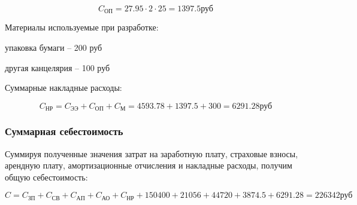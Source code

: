 $$ C_\text{ОП} = 27.95 \cdot 2 \cdot 25 = 1397.5 \text{руб} $$

\vspace{1em}

Материалы используемые при разработке: 
\begin{mintemize}
\item упаковка бумаги -- 200 руб
\item другая канцелярия -- 100 руб
\end{mintemize}

\vspace{1em}

Суммарные накладные расходы:

$$ C_\text{НР} = C_\text{ЭЭ} + C_\text{ОП} + C_\text{М}
= 4593.78 + 1397.5 + 300 = 6291.28 \text{руб} $$ 

\subsubsection{Суммарная себестоимость}

Суммируя полученные значения затрат на заработную плату, страховые
взносы, арендную плату, амортизационные отчисления и накладные расходы,
получим общую себестоимость:

$$ C = C_\text{ЗП} + C_\text{СВ} + C_\text{АП} + C_\text{АО} + C_\text{НР} +
150400 + 21056 + 44720 + 3874.5 + 6291.28 = 226342 \text{руб} $$ 
